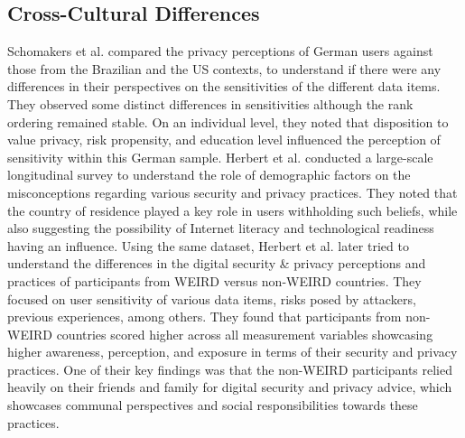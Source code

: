 \subsection{Cross-Cultural Differences} \label{subsec:cross culture}
Schomakers et al. \cite{schomakers_internet_2019} compared the privacy perceptions of German users against those from the Brazilian and the US contexts, to understand if there were any differences in their perspectives on the sensitivities of the different data items. They observed some distinct differences in sensitivities although the rank ordering remained stable. On an individual level, they noted that disposition to value privacy, risk propensity, and education level influenced the perception of sensitivity within this German sample. Herbert et al. \cite{herbert_world_2023} conducted a large-scale longitudinal survey to understand the role of demographic factors on the misconceptions regarding various security and privacy practices. They noted that the country of residence played a key role in users withholding such beliefs, while also suggesting the possibility of Internet literacy and technological readiness having an influence. Using the same dataset, Herbert et al. \cite{herbert_digital_nodate} later tried to understand the differences in the digital security \& privacy perceptions and practices of participants from WEIRD versus non-WEIRD countries. They focused on user sensitivity of various data items, risks posed by attackers, previous experiences, among others. They found that participants from non-WEIRD countries scored higher across all measurement variables showcasing higher awareness, perception, and exposure in terms of their security and privacy practices. One of their key findings was that the non-WEIRD participants relied heavily on their friends and family for digital security and privacy advice, which showcases communal perspectives and social responsibilities towards these practices.

